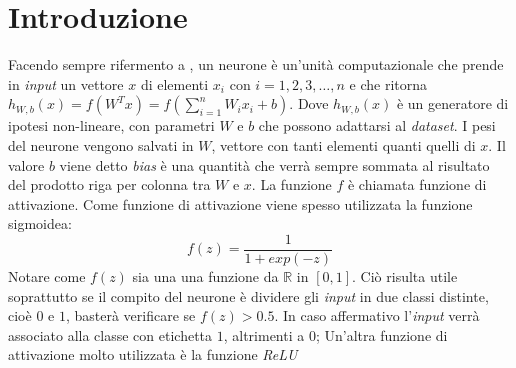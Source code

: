 
\chapter{Introduzione}

%
%
%
%






\clearpage
Facendo sempre rifermento a \cite{ng_sparse_ae}, un neurone è un'unità computazionale che prende in \textit{input} un vettore $x$ di elementi $x_i$ con $i=1,2,3,\dots,n$ e che ritorna $h_{W,b}(x) = f(W^Tx) = f(\sum_{i=1}^{n} W_i x_i + b)$.
Dove $h_{W,b}(x)$ è un generatore di ipotesi non-lineare, con parametri $W$ e $b$ che possono adattarsi al \textit{dataset}.
I pesi del neurone vengono salvati in $W$, vettore con tanti elementi quanti quelli di $x$.
Il valore $b$ viene detto \textit{bias} è una quantità che verrà sempre sommata al risultato del prodotto riga per colonna tra $W$ e $x$.
La funzione $f$ è chiamata funzione di attivazione.
Come funzione di attivazione viene spesso utilizzata la funzione sigmoidea:
\begin{equation*}
  f(z) = \frac{1}{1 + exp(-z)}
\end{equation*} %
Notare come $f(z)$ sia una una funzione da $\mathbb{R}$ in $[0,1]$.
Ciò risulta utile soprattutto se il compito del neurone è dividere gli \textit{input} in due classi distinte, cioè $0$ e $1$, basterà verificare se $f(z)>0.5$.
In caso affermativo l'\textit{input} verrà associato alla classe con etichetta $1$, altrimenti a $0$;
Un'altra funzione di attivazione molto utilizzata è la funzione \textit{ReLU}



